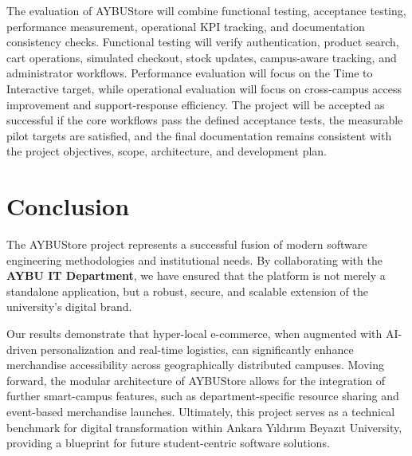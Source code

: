 \documentclass[11pt,a4paper]{article}
\begin{document}
The evaluation of AYBUStore will combine functional testing,
acceptance testing, performance measurement, operational KPI tracking,
and documentation consistency checks. Functional testing will verify
authentication, product search, cart operations, simulated checkout,
stock updates, campus-aware tracking, and administrator workflows.
Performance evaluation will focus on the Time to Interactive target,
while operational evaluation will focus on cross-campus access
improvement and support-response efficiency. The project will be
accepted as successful if the core workflows pass the defined
acceptance tests, the measurable pilot targets are satisfied, and the
final documentation remains consistent with the project objectives,
scope, architecture, and development plan.
 
 
\section{Conclusion}
The AYBUStore project represents a successful fusion of modern software engineering methodologies and institutional needs. By collaborating with the \textbf{AYBU IT Department}, we have ensured that the platform is not merely a standalone application, but a robust, secure, and scalable extension of the university's digital brand.
 
Our results demonstrate that hyper-local e-commerce, when augmented with AI-driven personalization and real-time logistics, can significantly enhance merchandise accessibility across geographically distributed campuses. Moving forward, the modular architecture of AYBUStore allows for the integration of further smart-campus features, such as department-specific resource sharing and event-based merchandise launches. Ultimately, this project serves as a technical benchmark for digital transformation within Ankara Yıldırım Beyazıt University, providing a blueprint for future student-centric software solutions.
 
\newpage
\end{document}
